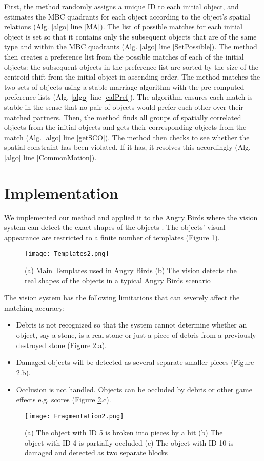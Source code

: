 \documentclass[letterpaper]{article}
\begin{document}
First, the method randomly assigns a unique ID to each initial object, and estimates the MBC quadrants for each object according to the object's spatial relations (Alg. \ref{algo} line \ref{MA}). The list of possible matches for each initial object is set so that it contains only the subsequent objects that are of the same type and within the MBC quadrants (Alg. \ref{algo} line \ref{SetPossible}). The method then creates a preference list from the possible matches of each of the initial objects: the subsequent objects in the preference list are sorted by the size of the centroid shift from the initial object in ascending order. The method matches the two sets of objects using a stable marriage algorithm \cite{gale1962college} with the pre-computed preference lists (Alg. \ref{algo} line \ref{calPref}). The algorithm ensures each match is stable in the sense that no pair of objects would prefer each other over their matched partners. Then, the method finds all groups of spatially correlated objects from the initial objects and gets their corresponding objects from the match (Alg. \ref{algo} line \ref{getSCO}). The method then checks to see whether the spatial constraint  has been violated. If it has, it resolves this accordingly (Alg. \ref{algo} line \ref{CommonMotion}).

\section{Implementation}
We implemented our method and applied it to the Angry Birds where the vision system can detect the exact shapes of the objects \cite{andrewwang}. The objects' visual appearance are restricted to a finite number of templates (Figure \ref{Templates}).  
\begin{figure}[t!]
\centering\texttt{[image: Templates2.png]}\caption{(a) Main Templates used in Angry Birds (b) The vision detects the real shapes of the objects in a typical Angry Birds scenario}
\label{Templates}
\end{figure}
The vision system has the following limitations that can severely affect the matching accuracy: 
\begin{itemize}
\item Debris is not recognized so that the system cannot determine whether an object, say a stone, is a real stone or just a piece of debris from a previously destroyed stone (Figure \ref{Fragments}.a).
\item Damaged objects will be detected as several separate smaller pieces (Figure \ref{Fragments}.b). 
\item Occlusion is not handled. Objects can be occluded by debris or other game effects e.g. scores (Figure \ref{Fragments}.c).
\end{itemize}
\begin{figure}[t!]
\centering\texttt{[image: Fragmentation2.png]}\caption{(a) The object with ID 5 is broken into pieces by a hit (b) The object with ID 4 is partially occluded (c) The object with ID 10 is damaged and detected as two separate blocks}
\label{Fragments}
\end{figure}
\end{document}
